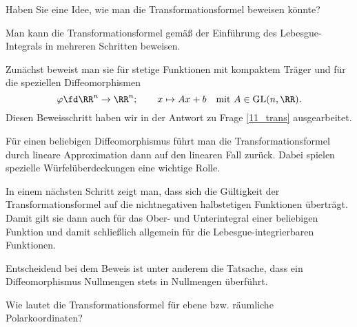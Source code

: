 \begin{frage}
  Haben Sie eine Idee, wie man die Transformationsformel beweisen 
  k\"onnte?
\end{frage}

\begin{antwort}
  Man kann die Transformationsformel gem\"a{\ss} der Einf\"uhrung des 
  Lebesgue-Integrals in mehreren Schritten beweisen. 

  Zun\"achst beweist man sie f\"ur stetige Funktionen mit kompaktem 
  Tr\"ager und f\"ur die speziellen Diffeomorphismen
  \[
  \varphi \fd  \RR^n \to \RR^n; \qquad
  x\mapsto Ax+b \quad\text{mit $A\in \mathrm{GL}(n,\RR)$}.
  \]
  Diesen Beweisschritt haben wir in der Antwort zu Frage 
  \ref{11_trans} ausgearbeitet.  

  F\"ur einen beliebigen Diffeomorphismus f\"uhrt man die 
  Transformationsformel 
  durch lineare Approximation dann auf den linearen Fall zur\"uck. Dabei 
  spielen spezielle W\"urfel\"uberdeckungen eine wichtige Rolle. 

  In einem n\"achsten Schritt zeigt man, dass sich die G\"ultigkeit 
  der Transformationsformel auf die nichtnegativen halbstetigen Funktionen 
  \"ubertr\"agt. Damit gilt sie dann auch f\"ur das Ober- und Unterintegral 
  einer beliebigen Funktion und damit schlie{\ss}lich allgemein 
  f\"ur die Lebesgue-integrierbaren Funktionen. 

  Entscheidend bei dem Beweis ist unter anderem die Tatsache, dass 
  ein Diffeomorphismus Nullmengen stets in Nullmengen \"uberf\"uhrt.
  \AntEnd
\end{antwort} 

\begin{frage}\label{11_polar}
  Wie lautet die Transformationsformel f\"ur ebene bzw. r\"aumliche 
  Polarkoordinaten?
\end{frage}

